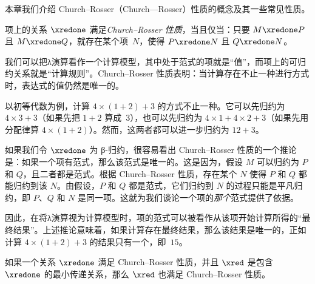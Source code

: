 \documentclass[../../../include/open-logic-section]{subfiles}
\begin{document}


本章我们介绍 Church--Rosser（Church—Rosser）性质的概念及其一些常见性质。

\begin{defn}
  项上的关系 $\xredone$ 满足\emph{Church--Rosser 性质}，当且仅当：只要 $M \xredone P$ 且 $M \xredone Q$，就存在某个项~$N$，使得 $P \xredone N$ 且 $Q \xredone N$。
\end{defn}

我们可以把λ演算看作一个计算模型，其中处于范式的项就是“值”，而项上的可归约关系就是“计算规则”。Church--Rosser 性质表明：当计算存在不止一种进行方式时，表达式的值仍然是唯一的。

以初等代数为例，计算 $4 \times (1+2) + 3$ 的方式不止一种。它可以先归约为 $4 \times 3+3$（如果先把 $1+2$ 算成~$3$），也可以先归约为 $4 \times 1+4 \times 2+3$（如果先用分配律算 $4 \times (1+2)$）。然而，这两者都可以进一步归约为 $12+3$。

如果我们令 $\xredone$ 为 β-归约，很容易看出 Church--Rosser 性质的一个推论是：如果一个项有范式，那么该范式是唯一的。这是因为，假设 $M$ 可以归约为 $P$ 和 $Q$，且二者都是范式。根据 Church--Rosser 性质，存在某个 $N$ 使得 $P$ 和 $Q$ 都能归约到该 $N$。由假设，$P$ 和 $Q$ 都是范式，它们归约到 $N$ 的过程只能是平凡归约，即 $P$、$Q$ 和 $N$ 是同一项。这就为我们谈论一个项的\emph{那个}范式提供了依据。

因此，在将λ演算视为计算模型时，项的范式可以被看作从该项开始计算所得的“最终结果”。上述推论意味着，如果计算存在最终结果，那么该结果是唯一的，正如计算 $4 \times (1+2)+3$ 的结果只有一个，即~$15$。

\begin{thm}
  如果一个关系 $\xredone$ 满足 Church--Rosser 性质，并且 $\xred$ 是包含 $\xredone$ 的最小传递关系，那么 $\xred$ 也满足 Church--Rosser 性质。
\end{thm}
\end{document}
